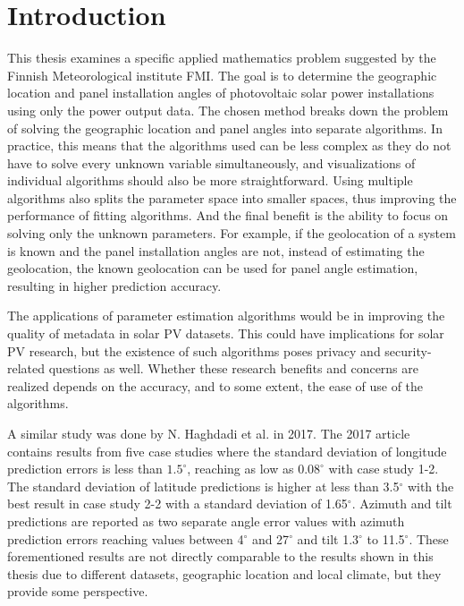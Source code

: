 \chapter{Introduction}

This thesis examines a specific applied mathematics problem suggested by the Finnish Meteorological institute FMI. The goal is to determine the geographic location and panel installation angles of photovoltaic solar power installations using only the power output data. The chosen method breaks down the problem of solving the geographic location and panel angles into separate algorithms. In practice, this means that the algorithms used can be less complex as they do not have to solve every unknown variable simultaneously, and visualizations of individual algorithms should also be more straightforward. Using multiple algorithms also splits the parameter space into smaller spaces, thus improving the performance of fitting algorithms. And the final benefit is the ability to focus on solving only the unknown parameters. For example, if the geolocation of a system is known and the panel installation angles are not, instead of estimating the geolocation, the known geolocation can be used for panel angle estimation, resulting in higher prediction accuracy.


The applications of parameter estimation algorithms would be in improving the quality of metadata in solar PV datasets. This could have implications for solar PV research, but the existence of such algorithms poses privacy and security-related questions as well. Whether these research benefits and concerns are realized depends on the accuracy, and to some extent, the ease of use of the algorithms.



A similar study was done by N. Haghdadi et al. in 2017\cite{navid_australian_article}. The 2017 article contains results from five case studies where the standard deviation of longitude prediction errors is less than $1.5^\circ$, reaching as low as $0.08^\circ$ with case study 1-2. The standard deviation of latitude predictions is higher at less than 3.5$^\circ$ with the best result in case study 2-2 with a standard deviation of 1.65$^\circ$. Azimuth and tilt predictions are reported as two separate angle error values with azimuth prediction errors reaching values between 4$^\circ$ and 27$^\circ$ and tilt 1.3$^\circ$ to 11.5$^\circ$. These forementioned results are not directly comparable to the results shown in this thesis due to different datasets, geographic location and local climate, but they provide some perspective.



